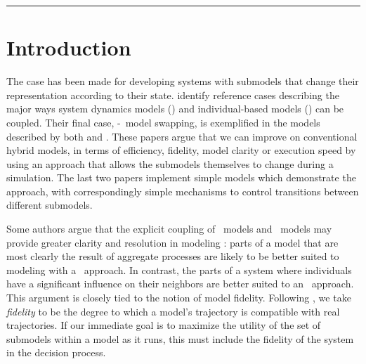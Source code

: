 \rule{\textwidth}{2pt}




\section{Introduction}
The case has been made for developing systems with sub\-models that
change their rep\-re\-sen\-ta\-tion according to their state.
\citet{vincenot2011theoretical} identify reference cases describing the
major ways system dynamics models (\SD) and in\-di\-vidu\-al-based models
(\IB) can be coupled. Their final case, \SD-\IB\ model swapping, is
exemplified in the models described by both \cite{bobashev2007hybrid}
and \cite{Gray2012adaptive}. These papers argue that we can improve on
conventional hybrid models, in terms of efficiency, fidelity, model
clarity or execution speed by using an approach that allows the
sub\-models themselves to change during a simulation. The last two
papers implement simple models which demonstrate the approach, with
correspondingly simple mechanisms to control transitions between
different sub\-models. 

Some authors argue that the explicit coupling of \SD\ models and
\IB\ models may provide greater clarity and resolution in modeling
\citep{vincenot2011theoretical,Fulton2010approaches}: parts of a model that are
most clearly the result of aggregate processes are likely to be better
suited to modeling with a \SD\ approach. In contrast, the
parts of a system where in\-di\-vidu\-als have a significant influence on
their neighbors \citep{botkin1972some} are better suited to an
\IB\ approach. This argument is closely tied to the notion of model
fidelity. Following \cite{delsole2010model}, we take
\emph{fidelity} to be the degree to which a model's trajectory is
compatible with real trajectories.  If our immediate goal is to
maximize the utility of the set of sub\-models within a model
as it runs, this must include the fidelity of the system in the
decision process.

